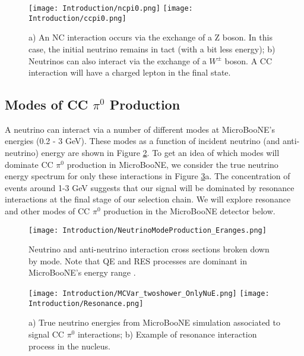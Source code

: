\begin{figure}[H]
\centering
\texttt{[image: Introduction/ncpi0.png]}
\hspace{3 mm}
\texttt{[image: Introduction/ccpi0.png]}
\caption{a) An NC interaction occurs via the exchange of a Z boson. In this case, the initial neutrino remains in tact (with a bit less energy); b) Neutrinos can also interact via the exchange of a $W^\pm$ boson. A CC interaction will have a charged lepton in the final state. } 
\label{fig:CCNC}
\end{figure}




\subsection{ Modes of CC $\pi^0$ Production}
A neutrino can interact via a number of different modes at MicroBooNE's energies (0.2 - 3 GeV). These modes as a function of incident neutrino (and anti-neutrino) energy are shown in Figure \ref{fig:numodes}. To get an idea of which modes will dominate CC $\pi^0$ production in MicroBooNE, we consider the true neutrino energy spectrum for only these interactions in Figure \ref{fig:res}a. The concentration of events around 1-3 GeV suggests that our signal will be dominated by resonance interactions at the final stage of our selection chain. We will explore resonance and other modes of CC $\pi^0$ production in the MicroBooNE detector below.

\begin{figure}[h!]
\centering
\texttt{[image: Introduction/NeutrinoModeProduction\_Eranges.png]}
\caption{Neutrino and anti-neutrino interaction cross sections broken down by mode. Note that QE and RES processes are dominant in MicroBooNE's energy range \cite{bib:gzeller}. }
\label{fig:numodes}
\end{figure}

\begin{figure}[h!]
\centering
\texttt{[image: Introduction/MCVar\_twoshower\_OnlyNuE.png]}
\hspace{2mm}
\texttt{[image: Introduction/Resonance.png]}
\caption{ a) True neutrino energies from MicroBooNE simulation associated to signal CC $\pi^0$ interactions; b) Example of resonance interaction process in the nucleus. }
\label{fig:res}
\end{figure}

